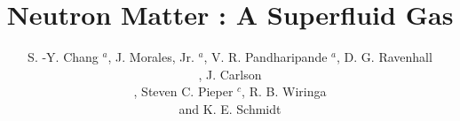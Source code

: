 

\def\tvij{\tilde{v}_{ij}}
\def\tv{\tilde{v}}
\def\dvij{\delta v ({\bf P}_{ij})}
\def\dv{\delta v }
\def\beq{\begin{equation}}
\def\eeq{\end{equation}}
\def\ba{\begin{eqnarray}}
\def\ea{\end{eqnarray}}
\def\vij{v_{ij}}
\def\Vijk{V_{ijk}}
\def\vet{v_{18}}
\def\v8p{v_8^\prime}
\def\vpi{v^{\pi}}
\def\Vtpip{V^{2\pi,PW}}
\def\Vtpis{V^{2\pi,SW}}
\def\Vthpi{V^{3\pi, \Delta R}}
\def\Vthpia{V^{3\pi, \Delta R}_1}
\def\Vthpib{V^{3\pi, \Delta R}_2}
\def\Otpip{O^{2\pi,PW}_{ijk}}
\def\Otpis{O^{2\pi,SW}_{ijk}}
\def\Othpi{O^{3\pi, \Delta R}_{ijk}}
\def\Othpia{O^{3\pi, \Delta R}_{1,ijk}}
\def\Othpib{O^{3\pi, \Delta R}_{2,ijk}}
\def\OR{O^R_{ijk}}
\def\Atpip{A_{2\pi}^{PW}}
\def\Atpis{A_{2\pi}^{SW}}
\def\Athpi{A_{3\pi}^{\Delta R}}
\def\Athpib{A_{2,3\pi}^{\Delta R}}
\def\AR{A_R}
\def\Vtpi{V^{2\pi}}
\def\vr{v^R}
\def\VR{V^R}
\def\rij{r_{ij}}
\def\opij{O^p_{ij}}
\def\vpij{v_p(r_{ij})}

\newcommand{\ttbs}{\char'134}
\newcommand{\AmS}{{\protect\the\textfont2
  A\kern-.1667em\lower.5ex\hbox{M}\kern-.125emS}}
\newcommand{\avet}{\mbox{AV18~}}
\newcommand{\avep}{\mbox{AV8$^\prime$~}}
\newcommand{\boldsigma}{\mbox{\boldmath$\sigma$}}
\newcommand{\boldtau}{\mbox{\boldmath$\tau$}}
\newcommand{\boldomega}{\mbox{\boldmath$\omega$}}
\newcommand{\boldtheta}{\mbox{\boldmath$\theta$}}
\newcommand{\boldnabla}{\mbox{\boldmath$\nabla$}}
\newcommand{\boldepsilon}{\mbox{\boldmath$\epsilon$}}


\title{Neutron Matter : A Superfluid Gas}

\author{S. -Y. Chang $^a$, J. Morales, Jr. $^a$, V. R. Pandharipande $^a$, D. G. Ravenhall 
\address{ Department of Physics,  University of Illinois at Urbana-Champaign, 
         Urbana, IL 61801}, J. Carlson \address{ Theoretical Division, 
	 Los Alamos National Laboratory, Los Alamos, NM 87545},
         Steven C. Pieper $^c$, R. B. Wiringa \address{ Physics Division, Argonne 
         National Laboratory, Argonne, IL 60439} and K. E. Schmidt \address{
         Department of Physics and Astronomy, Arizona State University, 
         Tempe, AZ 85287}}


